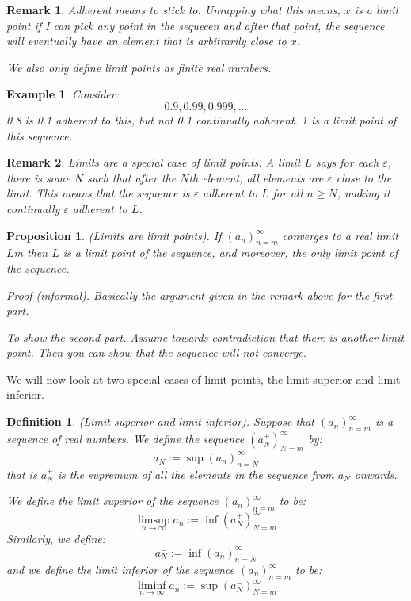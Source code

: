 \documentclass{article}
\newtheorem{example}{Example}[subsection]
\newtheorem{definition}{Definition}[subsection]
\newtheorem{remark}{Remark}[subsection]
\newtheorem{proposition}{Proposition}[subsection]
\newcommand{\vep}{\varepsilon} %
\let\it\textit
\begin{document}
\begin{remark}
	Adherent means to stick to. Unrapping what this means, 
	$x$ is a limit point if I can pick any point in the sequecen 
	and after that point, the sequence will eventually have an 
	element that is arbitrarily close to $x$.

	We also only define limit points as finite real numbers. 
\end{remark}

\begin{example}
	Consider:
	$$
	0.9, 0.99, 0.999, \dots
	$$
	0.8 is 0.1 adherent to this, but not 0.1 continually 
	adherent. 1 is a limit point of this sequence.
\end{example}

\begin{remark}
	Limits are a special case of limit points. 
	A limit $L$ says for each $\vep$, there is 
	some $N$ such that after the $N$th element, 
	all elements are $\vep$ close to the limit. 
	This means that the sequence is $\vep$ adherent
	to $L$ for all $n \geq N$, making it continually 
	$\vep$ adherent to $L$.
\end{remark}

\begin{proposition}
	(Limits are limit points). If $(a_n)_{n=m}^\infty$
	converges to a real limit $L$m then $L$ 
	is a limit point of the sequence, and 
	moreover, the only limit point of the sequence.  

	\it{Proof} (informal). Basically the argument
	given in the remark above for the first part.

	To show the second part. Assume towards contradiction 
	that there is another limit point. Then you can show 
	that the sequence will not converge.
\end{proposition}

We will now look at two special cases of limit points, the limit 
superior and limit inferior. 

\begin{definition}
	(Limit superior and limit inferior). Suppose that 
	$(a_n)_{n=m}^\infty$ is a sequence of real numbers.
	We define the sequence $(a_N^+)_{N=m}^\infty$ by:
	$$
	a_N^+ := \sup (a_n)_{n=N}^\infty
	$$
	that is $a_N^+$ is the supremum of all the elements 
	in the sequence from $a_N$ onwards. 

	We define the limit superior of the sequence
	$(a_n)_{n=m}^\infty$ to be:
	$$
	\limsup_{n\to\infty}a_n := \inf (a_N^+)_{N=m}^\infty
	$$
	Similarly, we define:
	$$
	a_N^- := \inf (a_n)_{n=N}^\infty
	$$
	and we define the limit inferior of the sequence
	$(a_n)_{n=m}^\infty$ to be:
	$$
	\liminf_{n\to\infty}a_n := \sup (a_N^-)_{N=m}^\infty
	$$
\end{definition}
\end{document}
